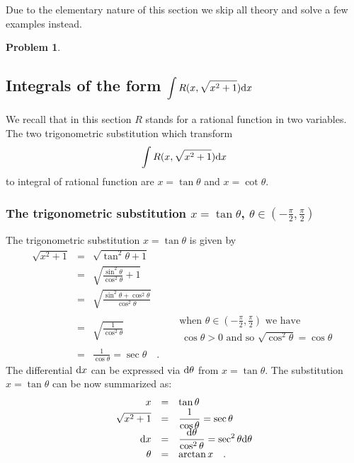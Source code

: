 \documentclass[12pt]{book}
\newtheorem{problem}[theorem]{Problem}
\begin{document}
Due to the elementary nature of this section we skip all theory and solve a few examples instead.
\begin{problem}

\end{problem}


\subsection{Integrals of the form $\displaystyle \int R(x,\sqrt{x^2+1}){\normalfont \text{d}} x$}
We recall that in this section $R$ stands for a rational function in two variables. The two trigonometric substitution which transform
\[
\int R(x, \sqrt{x^2+1}){\normalfont \text{d}} x
\]
to integral of rational function are $x=\tan \theta$ and $x=\cot \theta$.
\subsubsection{The trigonometric substitution $x=\tan \theta$, $\displaystyle \theta\in \left(-\frac{\pi}{2}, \frac{\pi}{2}\right)$ }\label{secTrigSubtanTheta}
The trigonometric substitution $x=\tan \theta$ is given by
\[
\begin{array}{rcll|l}
\displaystyle \sqrt{ x^2+1}&=&\displaystyle \sqrt{\tan^2 \theta+1}\\
&=&\displaystyle   \sqrt{ \frac{ \sin^2 \theta}{ \cos^2 \theta} +1}\\
&=&\displaystyle \sqrt{ \frac{ \sin^2\theta+\cos^2 \theta}{ \cos^2 \theta}} \\
&=& \displaystyle \sqrt{\frac{1}{\cos^2\theta}} && \begin{array}{l} \displaystyle \text{when }\theta\in \left(-\frac{\pi}{2}, \frac{\pi}{2}\right) \text{ we have }\\ ~ \cos \theta > 0\text{ and so } \sqrt{\cos^2 \theta}=\cos\theta \end{array}\\
&=&\displaystyle  \frac{1}{\cos \theta}= \sec \theta\quad .
\end{array}
\]
The differential ${\normalfont \text{d}} x$ can be expressed via ${\normalfont \text{d}} \theta$ from $x=\tan \theta$. The substitution $x=\tan \theta$ can be now summarized as:
\[
\begin{array}{rcl}
x&=&\displaystyle \tan \theta\\
\sqrt{x^2+1}& =& \displaystyle \frac{1}{\cos \theta}=\sec \theta\\
{\normalfont \text{d}} x &=&\displaystyle \frac{{\normalfont \text{d}} \theta}{\cos^2\theta}= \sec^2 \theta {\normalfont \text{d}} \theta\\
\theta& =& \arctan x\quad .
\end{array}
\]
\end{document}
